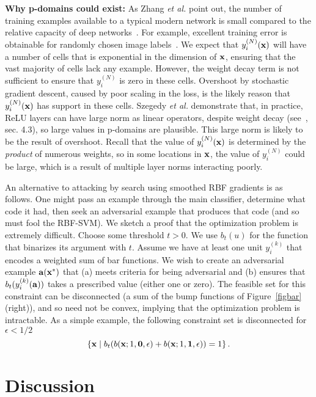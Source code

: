 \documentclass[10pt,twocolumn,letterpaper]{article}
\newcommand{\vect}[1]{{\bf {#1}}}
\begin{document}
{\bf Why p-domains could exist:} As Zhang {\em et al.} point out, the number of training examples available to a typical modern
network is small compared to the relative capacity of deep networks~\cite{zhang2017general}.  For example, excellent training error is obtainable for randomly chosen image labels~\cite{zhang2017general}.
We expect that $y_i^{(N)}(\vect{x})$ will have a number of cells that is exponential in the dimension of $\vect{x}$, ensuring that the vast majority of cells lack any
example.  However, the weight decay term is not sufficient to ensure that $y_i^{(N)}$ is zero in these cells.  Overshoot by stochastic gradient descent, caused by poor scaling in the loss, is the likely reason that 
$y_i^{(N)}(\vect{x})$ has support in these cells.  Szegedy {\em et al.} demonstrate that, in practice, ReLU layers can
have large norm as linear operators, despite weight decay (see~\cite{szegedy2013intriguing}, sec. 4.3), so large
values in p-domains are plausible.  This large norm is likely to be the result of overshoot.  Recall that the value of
$y_i^{(N)}(\vect{x})$ is  determined by the {\em product} of numerous weights, so in some locations in
$\vect{x}$, the value of $y_i^{(N)}$ could be  large, which is a result of multiple layer norms interacting poorly.

An alternative to attacking by search using smoothed RBF gradients is as follows. One might pass an example through the
main classifier, determine what code it had, then seek an adversarial example that produces that code (and so must fool
the RBF-SVM).  We sketch a proof that the optimization problem is extremely difficult.
Choose some threshold $t>0$.  We use $b_t(u)$ for the function that binarizes its argument with $t$.  Assume we have at least one unit $y_i^{(k)}$ that encodes
a weighted sum of bar functions.  We wish to create an adversarial example $\vect{a}(\vect{x}^*)$ that (a) meets criteria for being adversarial and (b) ensures 
that $b_t(y_i^{(k)}(\vect{a}))$ takes a prescribed value (either one or zero).   The feasible set for this constraint can be disconnected (\eg a sum of the bump functions of Figure~\ref{figbar} (right)), and so need not be 
convex, implying that the optimization problem is intractable.  As a simple example, the following constraint set is disconnected for $\epsilon < 1/2$ 
\[
\left\{ \vect{x} \mid b_t(b(\vect{x}; 1, \vect{0}, \epsilon)+b(\vect{x}; 1, \vect{1}, \epsilon))=1\right\}.
\]

\section{Discussion}
\end{document}
